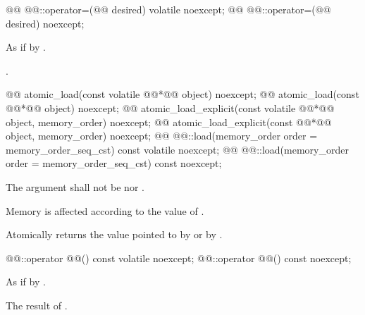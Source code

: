 %
\begin{itemdecl}
@@ @@::operator=(@@ desired) volatile noexcept;
@@ @@::operator=(@@ desired) noexcept;
\end{itemdecl}

\begin{itemdescr}
\pnum
\effects As if by .

\pnum
\returns {}.
\end{itemdescr}

%
%
%
\begin{itemdecl}
@@ atomic_load(const volatile @@*@\itcorr[-1]@ object) noexcept;
@@ atomic_load(const @@*@\itcorr[-1]@ object) noexcept;
@@ atomic_load_explicit(const volatile @@*@\itcorr[-1]@ object, memory_order) noexcept;
@@ atomic_load_explicit(const @@*@\itcorr[-1]@ object, memory_order) noexcept;
@@ @@::load(memory_order order = memory_order_seq_cst) const volatile noexcept;
@@ @@::load(memory_order order = memory_order_seq_cst) const noexcept;
\end{itemdecl}

\begin{itemdescr}
\pnum
\requires The  argument shall not be  nor .

\pnum
\effects Memory is affected according to the value of .

\pnum
\returns Atomically returns the value pointed to by  or by .
\end{itemdescr}

%
%
\begin{itemdecl}
@@::operator @@() const volatile noexcept;
@@::operator @@() const noexcept;
\end{itemdecl}

\begin{itemdescr}
\pnum
\effects As if by .

\pnum
\returns The result of .
\end{itemdescr}


